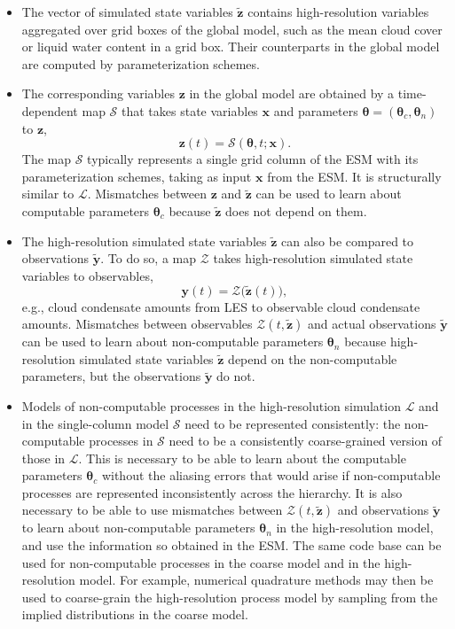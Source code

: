 \documentclass{article}
\renewcommand{\vec}[1]{\boldsymbol{{#1}}}
\begin{document}
\begin{itemize}
    \item The vector of simulated state variables $\vec{\tilde z}$ contains high-resolution variables aggregated over grid boxes of the global model,  such as the mean cloud cover or liquid water content in a grid box. Their counterparts in the global model are computed by parameterization schemes.
    \item The corresponding variables $\vec{z}$ in the global model are obtained by a time-depen\-dent map $\mathcal{S}$ that takes state variables $\vec{x}$ and parameters $\vec{\theta} = (\vec{\theta}_c, \vec{\theta}_n)$ to $\vec{z}$,
    \begin{equation}
    \vec{z}(t) = \mathcal{S}(\vec{\theta},t; \vec{x}).
    \end{equation}
    The map $\mathcal{S}$ typically represents a single grid column of the ESM with its parameterization schemes, taking as input $\vec{x}$ from the ESM. It is structurally similar to $\mathcal{L}$. Mismatches between $\vec{z}$ and $\vec{\tilde z}$ can be used to learn about computable parameters $\vec{\theta}_c$ because $\vec{\tilde z}$ does not depend on them.
    \item The high-resolution simulated state variables $\vec{\tilde z}$ can also be compared to observations $\vec{\tilde y}$. To do so, a map $\mathcal{Z}$ takes high-resolution simulated state variables to observables,
    \begin{equation}
        \vec{y}(t) = \mathcal{Z}\bigl(\vec{\tilde z}(t)\bigr),
    \end{equation}
    e.g., cloud condensate amounts from LES to observable cloud condensate amounts. Mismatches between observables $\mathcal{Z}(t, \vec{\tilde z})$ and actual observations $\vec{\tilde y}$ can be used to learn about non-computable parameters $\vec{\theta}_n$ because high-resolution simulated state variables $\vec{\tilde z}$ depend on the non-computable parameters, but the observations $\vec{\tilde y}$ do not. 
    \item  Models of non-computable processes in the high-resolution simulation $\mathcal{L}$ and in the single-column model $\mathcal{S}$ need to be represented consistently: the non-computable processes in $\mathcal{S}$ need to be a consistently coarse-grained version of those in $\mathcal{L}$. This is necessary to be able to learn about the computable parameters $\vec{\theta}_c$ without the aliasing errors that would arise if non-computable processes are represented inconsistently across the hierarchy. It is also necessary to be able to use mismatches between $\mathcal{Z}(t, \vec{\tilde z})$ and observations $\vec{\tilde y}$ to learn about non-computable parameters $\vec{\theta}_n$ in the high-resolution model, and use the information so obtained in the ESM. The same code base can be used for non-computable processes in the coarse model and in the high-resolution model. For example, numerical quadrature methods may then be used to coarse-grain the high-resolution process model by sampling from the implied distributions in the coarse model.
\end{itemize}
\end{document}
